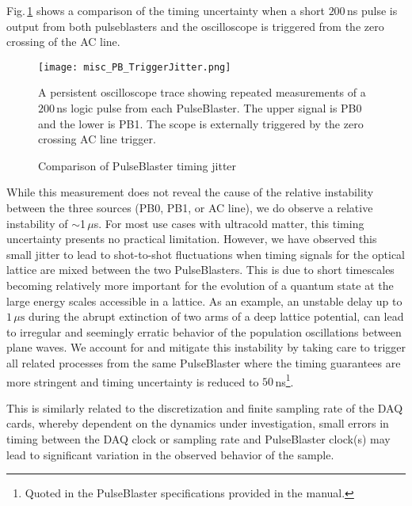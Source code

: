 Fig.\,\ref{fig:pbTimingJitter} shows a comparison of the timing uncertainty when a short $200$\,ns pulse is output from both pulseblasters and the oscilloscope is triggered from the zero crossing of the AC line.
	\begin{figure}
		\centerline{
		\texttt{[image: misc\_PB\_TriggerJitter.png]}}
		\caption{Comparison of PulseBlaster timing jitter}{A persistent oscilloscope trace showing repeated measurements of a $200$\,ns logic pulse from each PulseBlaster. The upper signal is PB0 and the lower is PB1. The scope is externally triggered by the zero crossing AC line trigger.}
		\label{fig:pbTimingJitter}
	\end{figure} 
While this measurement does not reveal the cause of the relative instability between the three sources (PB0, PB1, or AC line), we do observe a relative instability of $\sim$1\,$\mu$s.
For most use cases with ultracold matter, this timing uncertainty presents no practical limitation.
However, we have observed this small jitter to lead to shot-to-shot fluctuations when timing signals for the optical lattice are mixed between the two PulseBlasters.
This is due to short timescales becoming relatively more important for the evolution of a quantum state at the large energy scales accessible in a lattice.
As an example, an unstable delay up to $1\,\mu \text{s}$ during the abrupt extinction of two arms of a deep lattice potential, can lead to irregular and seemingly erratic behavior of the population oscillations between plane waves.
We account for and mitigate this instability by taking care to trigger all related processes from the same PulseBlaster where the timing guarantees are more stringent and timing uncertainty is reduced to $50$\,ns\footnote{Quoted in the PulseBlaster specifications provided in the manual.}.

This is similarly related to the discretization and finite sampling rate of the DAQ cards, whereby dependent on the dynamics under investigation, small errors in timing between the DAQ clock or sampling rate and PulseBlaster clock(s) may lead to significant variation in the observed behavior of the sample.



